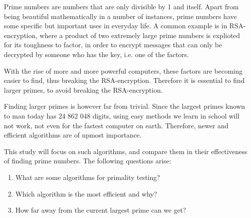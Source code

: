 \documentclass[main.tex]{subfiles}
\begin{document}
Prime numbers are numbers that are only divisible by 1 and itself. Apart from
being beautiful mathematically in a number of instances, prime numbers have some
specific but important uses in everyday life. A common example is in
RSA-encryption, where a product of two extremely large prime numbers is
explioted for its toughness to factor, in order to encrypt messages that can
only be decrypted by someone who has the key, i.e. one of the factors.

With the rise of more and more powerful computers, these factors are becoming
easier to find, thus breaking the RSA-encryption. Therefore it is essential to
find larger primes, to avoid breaking the RSA-encryption.

Finding larger primes is however far from trivial. Since the largest primes
known to man today has 24 862 048 digits, using easy methods we learn in school
will not work, not even for the fastest computer on earth. Therefore, newer and
efficient algorithms are of upmost importance.

This study will focus on such algorithms, and compare them in their
effectiveness of finding prime numbers. The following questions arise:

\begin{enumerate}
\item What are some algorithms for primality testing?
\item Which algorithm is the most efficient and why?
\item How far away from the current largest prime can we get?
\end{enumerate}
\end{document}
